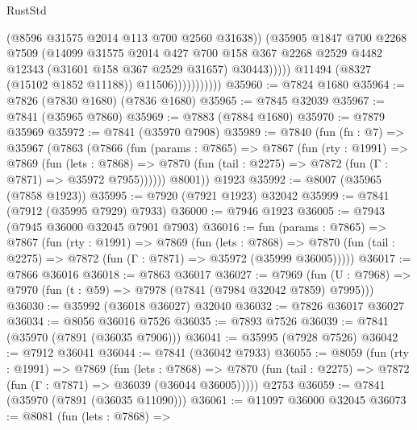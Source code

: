 \begin{lexlean}{RustStd}
\begin{coremodule}
                                  (@8596 @31575 @2014 @113 @700 @2560 @31638))
                                (@35905
                                  @1847
                                  @700
                                  @2268
                                  @7509
                                  (@14099
                                    @31575
                                    @2014
                                    @427
                                    @700
                                    @158
                                    @367
                                    @2268
                                    @2529
                                    @4482
                                    @12343
                                    (@31601 @158 @367 @2529 @31657)
                                    @30443)))))
                          @11494
                          (@8327 (@15102 @1852 @11188))
                          @11506)))))))))))
@35960 := @7824 @1680
@35964 := @7826 (@7830 @1680) (@7836 @1680)
@35965 := @7845 @32039
@35967 := @7841 (@35965 @7860)
@35969 := @7883 (@7884 @1680)
@35970 := @7879 @35969
@35972 := @7841 (@35970 @7908)
@35989 := @7840
    (fun (fn : @7) =>
    @35967
      (@7863
        (@7866
          (fun (params : @7865) =>
          @7867
            (fun (rty : @1991) =>
            @7869
              (fun (lets : @7868) =>
              @7870 (fun (tail : @2275) => @7872 (fun (Γ : @7871) => @35972 @7955))))))
        @8001))
    @1923
@35992 := @8007 (@35965 (@7858 @1923))
@35995 := @7920 (@7921 @1923) @32042
@35999 := @7841 (@7912 (@35995 @7929) @7933)
@36000 := @7946 @1923
@36005 := @7943 (@7945 @36000 @32045 @7901 @7903)
@36016 := fun (params : @7865) =>
  @7867
    (fun (rty : @1991) =>
    @7869
      (fun (lets : @7868) =>
      @7870 (fun (tail : @2275) => @7872 (fun (Γ : @7871) => @35972 (@35999 @36005)))))
@36017 := @7866 @36016
@36018 := @7863 @36017
@36027 := @7969
    (fun (U : @7968) => @7970 (fun (t : @59) => @7978 (@7841 (@7984 @32042 @7859) @7995)))
@36030 := @35992 (@36018 @36027) @32040
@36032 := @7826 @36017 @36027
@36034 := @8056 @36016 @7526
@36035 := @7893 @7526
@36039 := @7841 (@35970 (@7891 (@36035 @7906)))
@36041 := @35995 (@7928 @7526)
@36042 := @7912 @36041
@36044 := @7841 (@36042 @7933)
@36055 := @8059
    (fun (rty : @1991) =>
    @7869
      (fun (lets : @7868) =>
      @7870 (fun (tail : @2275) => @7872 (fun (Γ : @7871) => @36039 (@36044 @36005)))))
    @2753
@36059 := @7841 (@35970 (@7891 (@36035 @11090)))
@36061 := @11097 @36000 @32045
@36073 := @8081
    (fun (lets : @7868) =>

\end{coremodule}
\end{lexlean}
